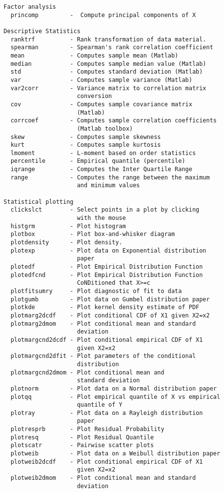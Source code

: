 {\begin{verbatim}
  Factor analysis
    princomp         -  Compute principal components of X

  Descriptive Statistics
    ranktrf          - Rank transformation of data material.
    spearman         - Spearman's rank correlation coefficient
    mean             - Computes sample mean (Matlab)
    median           - Computes sample median value (Matlab)
    std              - Computes standard deviation (Matlab)
    var              - Computes sample variance (Matlab)
    var2corr         - Variance matrix to correlation matrix
                       conversion
    cov              - Computes sample covariance matrix
                       (Matlab)
    corrcoef         - Computes sample correlation coefficients
                       (Matlab toolbox)
    skew             - Computes sample skewness
    kurt             - Computes sample kurtosis
    lmoment          - L-moment based on order statistics
    percentile       - Empirical quantile (percentile)
    iqrange          - Computes the Inter Quartile Range
    range            - Computes the range between the maximum
                       and minimum values

  Statistical plotting
    clickslct        - Select points in a plot by clicking
                       with the mouse
    histgrm          - Plot histogram
    plotbox          - Plot box-and-whisker diagram
    plotdensity      - Plot density.
    plotexp          - Plot data on Exponential distribution
                       paper
    plotedf          - Plot Empirical Distribution Function
    plotedfcnd       - Plot Empirical Distribution Function
                       CoNDitioned that X>=c
    plotfitsumry     - Plot diagnostic of fit to data
    plotgumb         - Plot data on Gumbel distribution paper
    plotkde          - Plot kernel density estimate of PDF
    plotmarg2dcdf    - Plot conditional CDF of X1 given X2=x2
    plotmarg2dmom    - Plot conditional mean and standard
                       deviation
    plotmargcnd2dcdf - Plot conditional empirical CDF of X1
                       given X2=x2
    plotmargcnd2dfit - Plot parameters of the conditional
                       distribution
    plotmargcnd2dmom - Plot conditional mean and
                       standard deviation
    plotnorm         - Plot data on a Normal distribution paper
    plotqq           - Plot empirical quantile of X vs empirical
                       quantile of Y
    plotray          - Plot data on a Rayleigh distribution
                       paper
    plotresprb       - Plot Residual Probability
    plotresq         - Plot Residual Quantile
    plotscatr        - Pairwise scatter plots
    plotweib         - Plot data on a Weibull distribution paper
    plotweib2dcdf    - Plot conditional empirical CDF of X1
                       given X2=x2
    plotweib2dmom    - Plot conditional mean and standard
                       deviation


\end{verbatim}}
